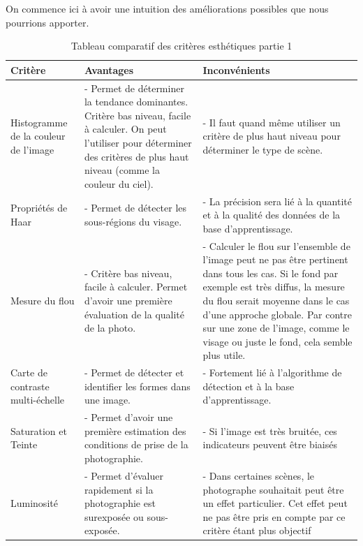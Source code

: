 \documentclass[11pt, french]{report-rd-info}
\begin{document}
On commence ici à avoir une intuition des améliorations possibles que nous pourrions apporter.
\begin{table}
\begin{center}
\begin{tabular}{|p{3cm}|p{6cm}|p{7cm}|}
\hline
\textbf{Critère} & \textbf{Avantages} & \textbf{Inconvénients} \\ \hline
Histogramme de la couleur de l'image & - Permet de déterminer la tendance dominantes. Critère bas niveau, facile à calculer. On peut l'utiliser pour déterminer des critères de plus haut niveau (comme la couleur du ciel). & - Il faut quand même utiliser un critère de plus haut niveau pour déterminer le type de scène. \\ \hline
Propriétés de Haar & - Permet de détecter les sous-régions du visage. & - La précision sera lié à la quantité et à la qualité des données de la base d'apprentissage. \\ \hline
Mesure du flou & - Critère bas niveau, facile à calculer. Permet d'avoir une première évaluation de la qualité de la photo. & - Calculer le flou sur l'ensemble de l'image peut ne pas être pertinent dans tous les cas. Si le fond par exemple est très diffus, la mesure du flou serait moyenne dans le cas d'une approche globale. Par contre sur une zone de l'image, comme le visage ou juste le fond, cela semble plus utile. \\ \hline
Carte de contraste multi-échelle & - Permet de détecter et identifier les formes dans une image. & - Fortement lié à l’algorithme de détection et à la base d'apprentissage. \\ \hline
Saturation et Teinte & - Permet d'avoir une première estimation des conditions de prise de la photographie. & - Si l'image est très bruitée, ces indicateurs peuvent être biaisés \\ \hline
Luminosité & - Permet d'évaluer rapidement si la photographie est surexposée ou sous-exposée. & - Dans certaines scènes, le photographe souhaitait peut être un effet particulier. Cet effet peut ne pas être pris en compte par ce critère étant plus objectif\\ \hline
\end{tabular}
\end{center}
\caption{Tableau comparatif des critères esthétiques partie 1}
\label{tab:ComparaisonCriteres1}
\end{table}
\end{document}
